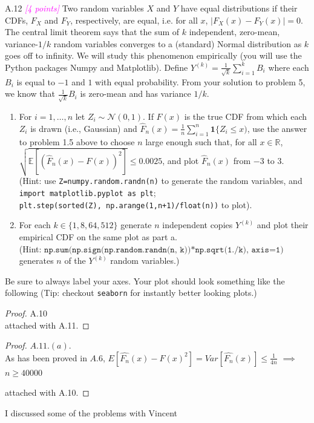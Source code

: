 \documentclass{article}
\newcommand{\field}[1]{\mathbb{#1}}
\newcommand{\1}{\mathbf{1}}
\newcommand{\E}{\mathbb{E}}
\newcommand{\R}{\field{R}} %
\newcommand{\points}[1]{\small\textcolor{magenta}{\emph{[#1 points]}} \normalsize}
\begin{document}
A.12 \points{4} Two random variables $X$ and $Y$ have equal
  distributions if their CDFs, $F_X$ and $F_Y$, respectively, are
  equal, i.e. for all $x$, $ |F_X(x) - F_Y(x)| = 0$. 
The central limit theorem says that the sum of $k$ independent,
zero-mean, variance-$1/k$ random variables converges to a (standard) Normal distribution as $k$ goes off to infinity.  
We will study this phenomenon empirically (you will use the Python packages Numpy and Matplotlib). 
Define $Y^{(k)} = \frac{1}{\sqrt{k}} \sum_{i=1}^k B_i$ where each $B_i$ is equal to $-1$ and $1$ with equal probability.
From your solution to problem 5, we know that $\frac{1}{\sqrt{k}} B_i$ is zero-mean and has variance $1/k$.
\begin{enumerate}
\item For $i=1,\dots,n$ let $Z_i \sim \mathcal{N}(0,1)$. If
  $F(x)$ is the true CDF from which each $Z_i$ is drawn (i.e.,
  Gaussian) and $\widehat{F}_n(x) = \frac{1}{n} \sum_{i=1}^n
  \1\{ Z_i \leq x)$, use the answer to problem 1.5  above to choose
  $n$ large enough such that, for all $x \in \R$, $ \sqrt{\E[
    (\widehat{F}_n(x)-F(x))^2 ]} \leq 0.0025$, and plot
  $\widehat{F}_n(x)$ from $-3$ to $3$. \\(Hint: use
  \texttt{Z=numpy.random.randn(n)} to generate the random
  variables, and \texttt{import matplotlib.pyplot as plt};\\
  \texttt{plt.step(sorted(Z), np.arange(1,n+1)/float(n))} to
  plot). 
\item For each $k \in \{1, 8, 64, 512\}$ generate $n$
  independent copies $Y^{(k)}$ and plot their empirical CDF on
  the same plot as part a.\\ (Hint: 
  $\texttt{np.sum(np.sign(np.random.randn(n,
    k))*np.sqrt(1./k), axis=1)}$ generates $n$ of the
  $Y^{(k)}$ random variables.) 
\end{enumerate}
Be sure to always label your axes. 
Your plot should look something like the following (Tip: checkout \texttt{seaborn} for instantly better looking plots.)

\begin{proof}
        A.10\\
attached with A.11.
\end{proof}

\begin{proof}
        $A.11.(a)$.\\
        As has been proved in $A.6$, $E[\widehat{F_n}(x) - F(x)^2] =Var[\widehat{F_n}(x)] \leq  \frac{1}{4n}$ $\implies $ $n\geq 40000$

attached with A.10.
\end{proof}

 I discussed some of the problems with Vincent
\end{document}
